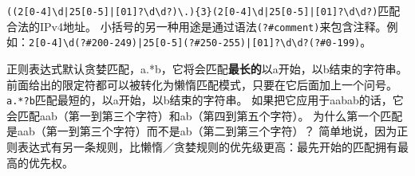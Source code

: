 \verb$((2[0-4]\d|25[0-5]|[01]?\d\d?)\.){3}(2[0-4]\d|25[0-5]|[01]?\d\d?)$匹配合法的IPv4地址。
小括号的另一种用途是通过语法\verb$(?#comment)$来包含注释。例如：\verb$2[0-4]\d(?#200-249)|25[0-5](?#250-255)|[01]?\d\d?(?#0-199)$。

正则表达式默认贪婪匹配，a.*b，它将会匹配\textbf{最长的}以a开始，以b结束的字符串。
前面给出的限定符都可以被转化为懒惰匹配模式，只要在它后面加上一个问号。\verb$a.*?b$匹配最短的，以a开始，以b结束的字符串。
如果把它应用于aabab的话，它会匹配aab（第一到第三个字符）和ab（第四到第五个字符）。
为什么第一个匹配是aab（第一到第三个字符）而不是ab（第二到第三个字符）？
简单地说，因为正则表达式有另一条规则，比懒惰／贪婪规则的优先级更高：最先开始的匹配拥有最高的优先权。
























